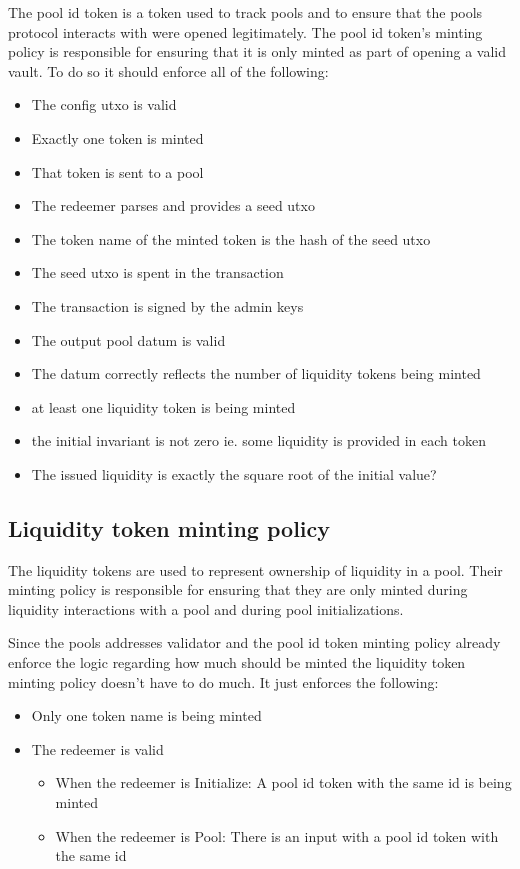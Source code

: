 \documentclass{article}
\begin{document}
The pool id token is a token used to track pools
and to ensure that the pools protocol interacts with were opened legitimately.
The pool id token's minting policy is responsible for ensuring
that it is only minted as part of opening a valid vault.
To do so it should enforce all of the following:

\begin{itemize}
	\item The config utxo is valid
	\item Exactly one token is minted
	\item That token is sent to a pool
	\item The redeemer parses and provides a seed utxo
	\item The token name of the minted token is the hash of the seed utxo
	\item The seed utxo is spent in the transaction
	\item The transaction is signed by the admin keys
	\item The output pool datum is valid
	\item The datum correctly reflects the number of liquidity tokens being minted
	\item at least one liquidity token is being minted
	\item the initial invariant is not zero ie. some liquidity is provided in each token
	\item The issued liquidity is exactly the square root of the initial value?
\end{itemize}

\subsection{Liquidity token minting policy}

The liquidity tokens are used to represent ownership of liquidity in a pool.
Their minting policy is responsible for ensuring that they are only minted
during liquidity interactions with a pool and during pool initializations.

Since the pools addresses validator and the pool id token minting policy
already enforce the logic regarding how much should be minted the liquidity
token minting policy doesn't have to do much. It just enforces the following:
\begin{itemize}
	\item Only one token name is being minted
	\item The redeemer is valid
		\begin{itemize}
			\item When the redeemer is Initialize: A pool id token with the same id is being minted
			\item When the redeemer is Pool: There is an input with a pool id token with the same id
		\end{itemize}
\end{itemize}
\end{document}
